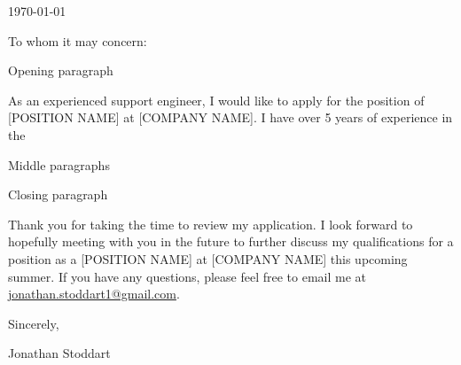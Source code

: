 \documentclass{ExpressiveCoverLetter}
\begin{document}
\coverletterheader[
    firstname=Jonathan,
    middleinitial=G,
    lastname=Stoddart,
    email=jonathan.stoddart1@gmail.com,
    phone=+447392150588,
    city=London,
    state=UK
]

\vspace{0.25in}
\today
\vspace{0.15in}


To whom it may concern:


Opening paragraph


As an experienced support engineer, I would like to apply for the
position of [POSITION NAME] at [COMPANY NAME]. I have over 5 years of
experience in the

Middle paragraphs


Closing paragraph

Thank you for taking the time to review my application. I look forward
to hopefully meeting with you in the future to further discuss my
qualifications for a position as a [POSITION NAME] at [COMPANY NAME]
this upcoming summer. If you have any questions, please feel free to
email me at \href{mailto:jonathan.stoddart1@gmail.com}{jonathan.stoddart1@gmail.com}.

Sincerely,

\vspace{.15in}

Jonathan Stoddart
\end{document}
